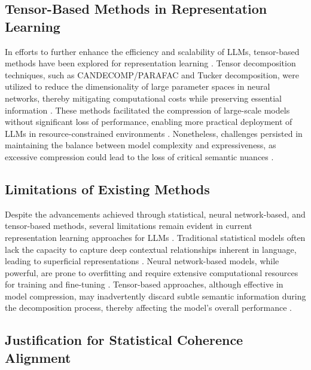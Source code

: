 \subsection{Tensor-Based Methods in Representation Learning}

In efforts to further enhance the efficiency and scalability of LLMs, tensor-based methods have been explored for representation learning \cite{tsuruta2024investigating}. Tensor decomposition techniques, such as CANDECOMP/PARAFAC and Tucker decomposition, were utilized to reduce the dimensionality of large parameter spaces in neural networks, thereby mitigating computational costs while preserving essential information \cite{rateri2024automated, rixewa2024interleaved}. These methods facilitated the compression of large-scale models without significant loss of performance, enabling more practical deployment of LLMs in resource-constrained environments \cite{mcintosh2024reasoning}. Nonetheless, challenges persisted in maintaining the balance between model complexity and expressiveness, as excessive compression could lead to the loss of critical semantic nuances \cite{men2024large,aturd2024dynamic}.

\subsection{Limitations of Existing Methods}

Despite the advancements achieved through statistical, neural network-based, and tensor-based methods, several limitations remain evident in current representation learning approaches for LLMs \cite{hawks2024neural}. Traditional statistical models often lack the capacity to capture deep contextual relationships inherent in language, leading to superficial representations \cite{penicig2024assessing}. Neural network-based models, while powerful, are prone to overfitting and require extensive computational resources for training and fine-tuning \cite{hisaharo2024optimizing,chard2024auditing}. Tensor-based approaches, although effective in model compression, may inadvertently discard subtle semantic information during the decomposition process, thereby affecting the model's overall performance \cite{alouris2024dynamic}.

\subsection{Justification for Statistical Coherence Alignment}

